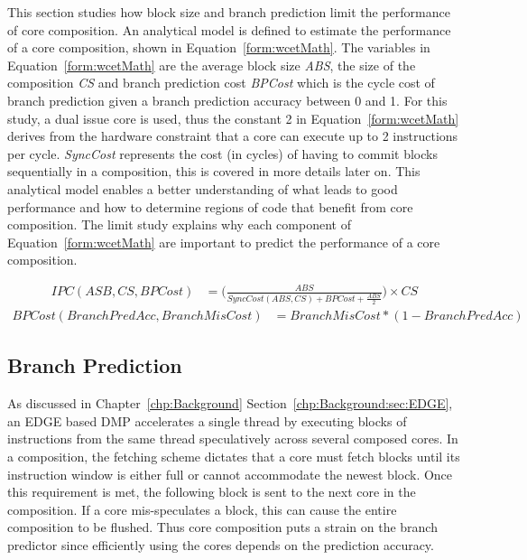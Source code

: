 This section studies how block size and branch prediction limit the performance of core composition.
An analytical model is defined to estimate the performance of a core composition, shown in Equation~\ref{form:wcetMath}.
The variables in Equation~\ref{form:wcetMath} are the average block size \textit{ABS},  the size of the composition \textit{CS} and branch prediction cost \textit{BPCost} which is the cycle cost of branch prediction given a branch prediction accuracy between 0 and 1.
For this study, a dual issue core is used, thus the constant 2 in Equation~\ref{form:wcetMath} derives from the hardware constraint that a core can execute up to 2 instructions per cycle.
\textit{SyncCost} represents the cost (in cycles) of having to commit blocks sequentially in a composition, this is covered in more details later on.
This analytical model enables a better understanding of what leads to good performance and how to determine regions of code that benefit from core composition.
The limit study explains why each component of Equation~\ref{form:wcetMath} are important to predict the performance of a core composition.

\begin{align}\label{form:wcetMath}
IPC(ASB,CS,BPCost) &= \bigg(\frac{ABS}{SyncCost(ABS,CS) + BPCost+ {\frac{ABS}{2}}}\bigg) \times CS
\end{align}
\begin{align}
BPCost(BranchPredAcc,BranchMisCost) &= BranchMisCost * ( 1 - BranchPredAcc)
\end{align}

\subsection{Branch Prediction}

As discussed in Chapter~\ref{chp:Background} Section~\ref{chp:Background:sec:EDGE}, an EDGE based DMP accelerates a single thread by executing blocks of instructions from the same thread speculatively across several composed cores. 
In a composition, the fetching scheme dictates that a core must fetch blocks until its instruction window is either full or cannot accommodate the newest block.
Once this requirement is met, the following block is sent to the next core in the composition.
If a core mis-speculates a block, this can cause the entire composition to be flushed.
Thus core composition puts a strain on the branch predictor since efficiently using the cores depends on the prediction accuracy.

